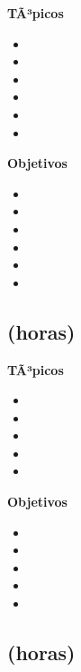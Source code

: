 \textbf{TÃ³picos}
\begin{itemize}
	\item \PFUNOTopicSintaxis
	\item \PFUNOTopicVariables
	\item \PFUNOTopicEntrada
	\item \PFUNOTopicEstructuras
	\item \PFUNOTopicFunciones
	\item \PFUNOTopicDescomposicion
\end{itemize}

\textbf{Objetivos}
\begin{itemize}
	\item \PFUNOObjUNO
	\item \PFUNOObjDOS
	\item \PFUNOObjTRES
	\item \PFUNOObjCUATRO
	\item \PFUNOObjCINCO
	\item \PFUNOObjSEIS
\end{itemize}

\subsection{\PFDOSDef  (\PFDOSHours horas)}\label{sec:BOK-PF2}

\textbf{TÃ³picos}
\begin{itemize}
	\item \PFDOSTopicEstrategias
	\item \PFDOSTopicEl
	\item \PFDOSTopicEstrategiasde
	\item \PFDOSTopicEstrategiasdedepuracion
	\item \PFDOSTopicElConcepto
\end{itemize}

\textbf{Objetivos}
\begin{itemize}
	\item \PFDOSObjUNO
	\item \PFDOSObjDOS
	\item \PFDOSObjTRES
	\item \PFDOSObjCUATRO
	\item \PFDOSObjCINCO
\end{itemize}

\subsection{\PFTRESDef  (\PFTRESHours horas)}\label{sec:BOK-PF3}

